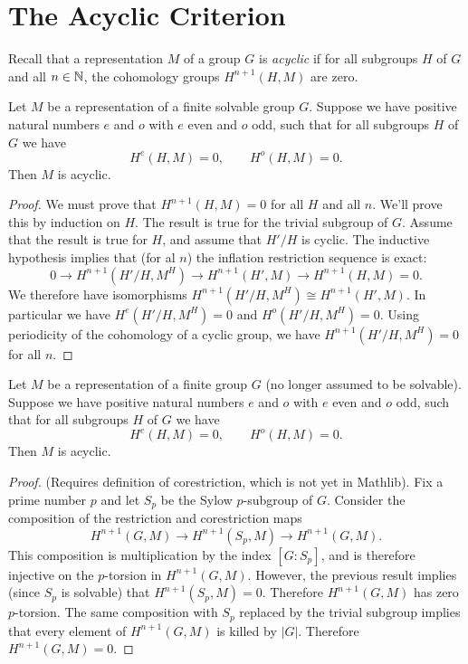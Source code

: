 \section{The Acyclic Criterion}

Recall that a representation $M$ of a group $G$ is \emph{acyclic} if for all subgroups $H$ of $G$
and all $n \in {\mathbb N}$, the cohomology groups $H^{n+1}(H,M)$ are zero.


\begin{theorem}
	Let $M$ be a representation of a finite solvable group $G$.
	Suppose we have positive natural numbers $e$ and $o$ with $e$ even and $o$ odd, such that for all subgroups $H$ of $G$ we have
	\[
		H^e(H,M) =0, \qquad H^o(H,M) = 0.
	\]
	Then $M$ is acyclic.
\end{theorem}

\begin{proof}
	We must prove that $H^{n+1}(H,M) = 0$ for all $H$ and all $n$.
	We'll prove this by induction on $H$. The result is true for the trivial subgroup of $G$.
	Assume that the result is true for $H$, and assume that $H' / H$ is cyclic.
	The inductive hypothesis implies that (for al $n$) the inflation restriction sequence is exact:
	\[
		0 \to H^{n + 1} (H'/H, M^H) \to H^{n+1}(H' , M) \to H^{n+1}(H,M)= 0.
	\]
	We therefore have isomorphisms $H^{n + 1} (H'/H, M^H) \cong H^{n+1}(H' , M)$.
	In particular we have $H^{e} (H'/H, M^H) = 0$ and $H^{o} (H'/H, M^H) = 0$.
	Using periodicity of the cohomology of a cyclic group, we have $H^{n+1}(H'/H,M^H)=0$ for all $n$.
\end{proof}


\begin{theorem}
	Let $M$ be a representation of a finite group $G$ (no longer assumed to be solvable).
	Suppose we have positive natural numbers $e$ and $o$ with $e$ even and $o$ odd, such that for all subgroups $H$ of $G$ we have
	\[
		H^e(H,M) =0, \qquad H^o(H,M) = 0.
	\]
	Then $M$ is acyclic.
\end{theorem}

\begin{proof}
	(Requires definition of corestriction, which is not yet in Mathlib).
	Fix a prime number $p$ and let $S_p$ be the Sylow $p$-subgroup of $G$.
	Consider the composition of the restriction and corestriction maps
	\[
		H^{n+1}(G,M) \to H^{n+1}(S_p,M) \to H^{n+1}(G,M).
	\]
	This composition is multiplication by the index $[G:S_p]$, and is therefore injective on the $p$-torsion
	in $H^{n+1}(G,M)$.
	However, the previous result implies (since $S_p$ is solvable) that $H^{n+1}(S_p,M)=0$.
	Therefore $H^{n+1}(G,M)$ has zero $p$-torsion.
	The same composition with $S_p$ replaced by the trivial subgroup implies that every element
	of $H^{n+1}(G,M)$ is killed by $|G|$.
	Therefore $H^{n+1}(G,M) = 0$.
\end{proof}



